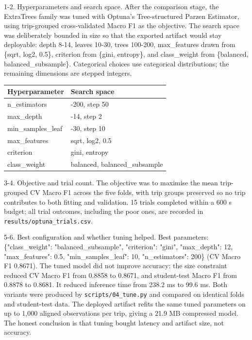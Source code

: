 \documentclass[11pt,a4paper]{article}
\newcommand{\code}[1]{\texttt{\small #1}}
\begin{document}
1-2. Hyperparameters and search space. After the comparison stage, the ExtraTrees family was tuned with Optuna's Tree-structured Parzen Estimator, using trip-grouped cross-validated Macro F1 as the objective. The search space was deliberately bounded in size so that the exported artifact would stay deployable: depth 8-14, leaves 10-30, trees 100-200, max\_features drawn from \{sqrt, log2, 0.5\}, criterion from \{gini, entropy\}, and class\_weight from \{balanced, balanced\_subsample\}. Categorical choices use categorical distributions; the remaining dimensions are stepped integers.

\begin{table}[H]
\centering
\footnotesize
\begin{tabularx}{\textwidth}{>{\raggedright\arraybackslash}p{5.25cm}>{\raggedright\arraybackslash}p{10.51cm}}
\toprule
\textbf{Hyperparameter} & \textbf{Search space} \\
\midrule
n\_\allowbreak{}estimators & 100-\allowbreak{}200,\allowbreak{} step 50 \\
max\_\allowbreak{}depth & 8-\allowbreak{}14,\allowbreak{} step 2 \\
min\_\allowbreak{}samples\_\allowbreak{}leaf & 10-\allowbreak{}30,\allowbreak{} step 10 \\
max\_\allowbreak{}features & sqrt,\allowbreak{} log2,\allowbreak{} 0.\allowbreak{}5 \\
criterion & gini,\allowbreak{} entropy \\
class\_\allowbreak{}weight & balanced,\allowbreak{} balanced\_\allowbreak{}subsample \\
\bottomrule
\end{tabularx}
\end{table}

3-4. Objective and trial count. The objective was to maximise the mean trip-grouped CV Macro F1 across the five folds, with trip groups preserved so no trip contributes to both fitting and validation. 15 trials completed within a 600 s budget; all trial outcomes, including the poor ones, are recorded in \code{results/\allowbreak{}optuna\_\allowbreak{}trials.\allowbreak{}csv}.

5-6. Best configuration and whether tuning helped. Best parameters: \{"class\_weight": "balanced\_subsample", "criterion": "gini", "max\_depth": 12, "max\_features": 0.5, "min\_samples\_leaf": 10, "n\_estimators": 200\} (CV Macro F1 0.8671). The tuned model did not improve accuracy: the size constraint reduced CV Macro F1 from 0.8858 to 0.8671, and student-test Macro F1 from 0.8878 to 0.8681. It reduced inference time from 238.2 ms to 99.6 ms. Both variants were produced by \code{scripts/\allowbreak{}04\_\allowbreak{}tune.\allowbreak{}py} and compared on identical folds and student-test data. The deployed artifact refits the same tuned parameters on up to 1,000 aligned observations per trip, giving a 21.9 MB compressed model. The honest conclusion is that tuning bought latency and artifact size, not accuracy.
\end{document}
